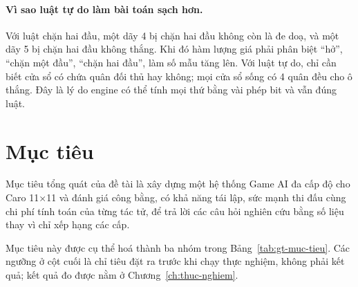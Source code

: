 \paragraph{Vì sao luật tự do làm bài toán sạch hơn.} Với luật chặn hai đầu, một dãy 4 bị chặn
hai đầu không còn là đe doạ, và một dãy 5 bị chặn hai đầu không thắng. Khi đó hàm lượng giá
phải phân biệt ``hở'', ``chặn một đầu'', ``chặn hai đầu'', làm số mẫu tăng lên. Với luật tự do,
chỉ cần biết cửa sổ có chứa quân đối thủ hay không; mọi cửa sổ sống có 4 quân đều cho ô thắng.
Đây là lý do engine có thể tính mọi thứ bằng vài phép bit và vẫn đúng luật.

\section{Mục tiêu}
\label{sec:gt-muc-tieu}
Mục tiêu tổng quát của đề tài là xây dựng một hệ thống Game AI đa cấp độ cho Caro 11×11 và đánh giá công bằng, có khả năng tái lập, sức mạnh thi đấu cùng chi phí tính toán của từng tác tử, để trả lời các câu hỏi nghiên cứu bằng số liệu thay vì chỉ xếp hạng các cấp.

Mục tiêu này được cụ thể hoá thành ba nhóm trong Bảng~\ref{tab:gt-muc-tieu}. Các ngưỡng ở cột cuối là chỉ tiêu đặt ra trước khi chạy thực nghiệm, không phải kết quả; kết quả đo được nằm ở Chương~\ref{ch:thuc-nghiem}.

